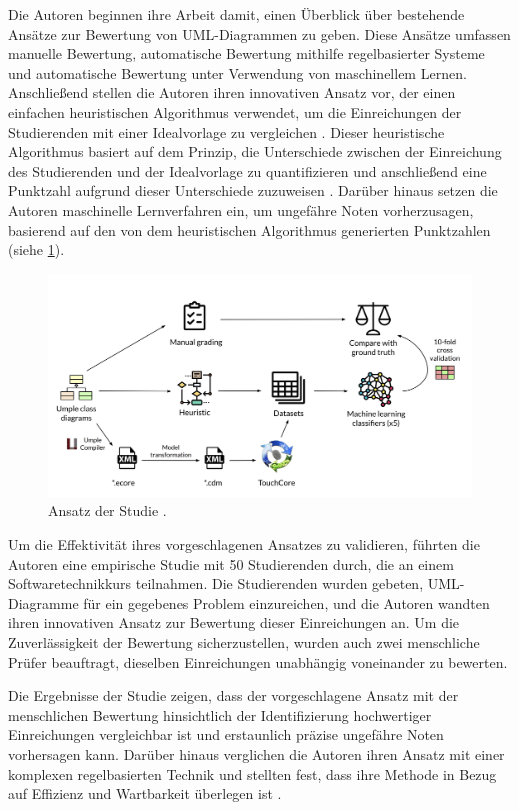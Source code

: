 Die Autoren beginnen ihre Arbeit damit, einen Überblick über bestehende Ansätze zur Bewertung von UML-Diagrammen zu geben. Diese Ansätze umfassen manuelle Bewertung, automatische Bewertung mithilfe regelbasierter Systeme und automatische Bewertung unter Verwendung von maschinellem Lernen. Anschließend stellen die Autoren ihren innovativen Ansatz vor, der einen einfachen heuristischen Algorithmus verwendet, um die Einreichungen der Studierenden mit einer Idealvorlage zu vergleichen \cite{boubekeur2020automatic}. Dieser heuristische Algorithmus basiert auf dem Prinzip, die Unterschiede zwischen der Einreichung des Studierenden und der Idealvorlage zu quantifizieren und anschließend eine Punktzahl aufgrund dieser Unterschiede zuzuweisen \cite{huyck1993efficient}. Darüber hinaus setzen die Autoren maschinelle Lernverfahren ein, um ungefähre Noten vorherzusagen, basierend auf den von dem heuristischen Algorithmus generierten Punktzahlen (siehe \ref{fig:ml-approach}).

\begin{figure}
	\centering
	\includegraphics[width=14cm]{images/ml-approach.png}
	\caption{Ansatz der Studie \cite{boubekeur2020automatic}.}
	\label{fig:ml-approach}
\end{figure}

Um die Effektivität ihres vorgeschlagenen Ansatzes zu validieren, führten die Autoren eine empirische Studie mit 50 Studierenden durch, die an einem Softwaretechnikkurs teilnahmen. Die Studierenden wurden gebeten, UML-Diagramme für ein gegebenes Problem einzureichen, und die Autoren wandten ihren innovativen Ansatz zur Bewertung dieser Einreichungen an. Um die Zuverlässigkeit der Bewertung sicherzustellen, wurden auch zwei menschliche Prüfer beauftragt, dieselben Einreichungen unabhängig voneinander zu bewerten.

Die Ergebnisse der Studie zeigen, dass der vorgeschlagene Ansatz mit der menschlichen Bewertung hinsichtlich der Identifizierung hochwertiger Einreichungen vergleichbar ist und erstaunlich präzise ungefähre Noten vorhersagen kann. Darüber hinaus verglichen die Autoren ihren Ansatz mit einer komplexen regelbasierten Technik und stellten fest, dass ihre Methode in Bezug auf Effizienz und Wartbarkeit überlegen ist \cite{boubekeur2020automatic}.

